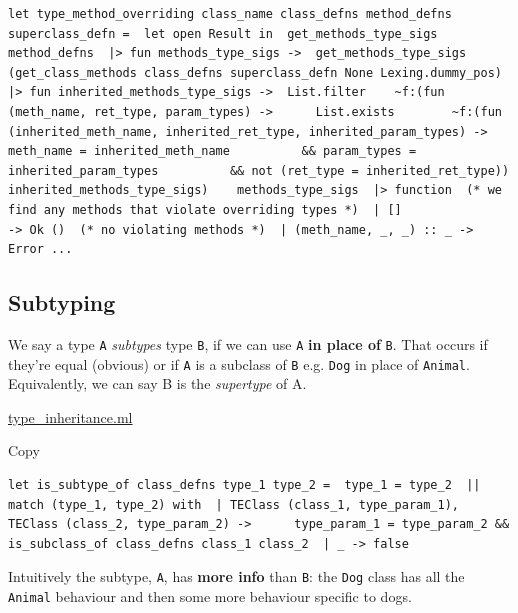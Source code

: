\begin{lstlisting}[caption={type\_inheritance.ml},language=caml]
let type_method_overriding class_name class_defns method_defns superclass_defn =  let open Result in  get_methods_type_sigs method_defns  |> fun methods_type_sigs ->  get_methods_type_sigs  (get_class_methods class_defns superclass_defn None Lexing.dummy_pos)  |> fun inherited_methods_type_sigs ->  List.filter    ~f:(fun (meth_name, ret_type, param_types) ->      List.exists        ~f:(fun (inherited_meth_name, inherited_ret_type, inherited_param_types) ->          meth_name = inherited_meth_name          && param_types = inherited_param_types          && not (ret_type = inherited_ret_type))        inherited_methods_type_sigs)    methods_type_sigs  |> function  (* we find any methods that violate overriding types *)  | []                     -> Ok ()  (* no violating methods *)  | (meth_name, _, _) :: _ ->      Error ...
\end{lstlisting}

\hypertarget{subtyping}{%
\subsection{\texorpdfstring{\protect\hyperlink{subtyping}{}Subtyping}{Subtyping}}\label{subtyping}}

We say a type \texttt{A} \emph{subtypes} type \texttt{B}, if we can use
\texttt{A} \textbf{in place of} \texttt{B}. That occurs if they're equal
(obvious) or if \texttt{A} is a subclass of \texttt{B} e.g. \texttt{Dog}
in place of \texttt{Animal}. Equivalently, we can say B is the
\emph{supertype} of A.

{
\href{https://github.com/mukul-rathi/bolt/blob/master/src/frontend/typing/type_env.type_inheritance\#L14-L20}{type\_inheritance.ml}}

Copy

\begin{lstlisting}[caption={type\_inheritance.ml},language=caml]
let is_subtype_of class_defns type_1 type_2 =  type_1 = type_2  ||  match (type_1, type_2) with  | TEClass (class_1, type_param_1), TEClass (class_2, type_param_2) ->      type_param_1 = type_param_2 && is_subclass_of class_defns class_1 class_2  | _ -> false
\end{lstlisting}

Intuitively the subtype, \texttt{A}, has \textbf{more info} than
\texttt{B}: the \texttt{Dog} class has all the \texttt{Animal} behaviour
and then some more behaviour specific to dogs.

